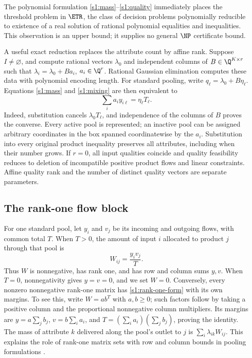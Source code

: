 The polynomial formulation \eqref{s1:mass}--\eqref{s1:quality} immediately
places the threshold problem in $\ETR$, the class of decision problems
polynomially reducible to existence of a real solution of rational
polynomial equalities and inequalities. This observation is an upper
bound; it supplies no general $\NP$ certificate bound.

A useful exact reduction replaces the attribute count by affine rank.
Suppose $I\ne\varnothing$, and compute rational vectors $\lambda_0$ and
independent columns of $B\in\Q^{K\times r}$ such that
$\lambda_i=\lambda_0+Ba_i$, $a_i\in\Q^r$. Rational Gaussian elimination
computes these data with polynomial encoding length. For standard
pooling, write $q_\ell=\lambda_0+B\eta_\ell$. Equations
\eqref{s1:mass} and \eqref{s1:mixing} are then equivalent to
\begin{equation}
 \sum_i a_i y_{i\ell}=\eta_\ell T_\ell.\label{s1:rank-coordinate}
\end{equation}
Indeed, substitution cancels $\lambda_0T_\ell$, and independence of the
columns of $B$ proves the converse. Every active pool is represented;
an inactive pool can be assigned arbitrary coordinates in the box spanned
coordinatewise by the $a_i$. Substitution into every original product
inequality preserves all attributes, including when their number grows.
If $r=0$, all input qualities coincide and quality feasibility reduces
to deletion of incompatible positive product flows and linear constraints.
Affine quality rank and the number of distinct quality vectors are
separate parameters.

\subsection{The rank-one flow block}\label{s1:rank-one}

For one standard pool, let $y_i$ and $v_j$ be its incoming and outgoing
flows, with common total $T$. When $T>0$, the amount of input $i$
allocated to product $j$ through that pool is
\begin{equation}
 W_{ij}=\frac{y_iv_j}{T}.\label{s1:rank-one-form}
\end{equation}
Thus $W$ is nonnegative, has rank one, and has row and column sums $y,v$.
When $T=0$, nonnegativity gives $y=v=0$, and we set $W=0$.
Conversely, every nonzero nonnegative rank-one matrix has
\eqref{s1:rank-one-form} with its own margins. To see this, write
$W=ab^T$ with $a,b\ge0$; such factors follow by taking a positive column
and the proportional nonnegative column multipliers. Its margins are
$y=a\sum_jb_j$, $v=b\sum_i a_i$, and
$T=(\sum_i a_i)(\sum_jb_j)$, proving the identity.
The mass of attribute $k$ delivered along the pool's outlet to $j$ is
$\sum_i\lambda_{ik}W_{ij}$. This explains the role of rank-one matrix
sets with row and column bounds in pooling formulations
\citep{dey2020-convexifications-of-rank-one-based}.

